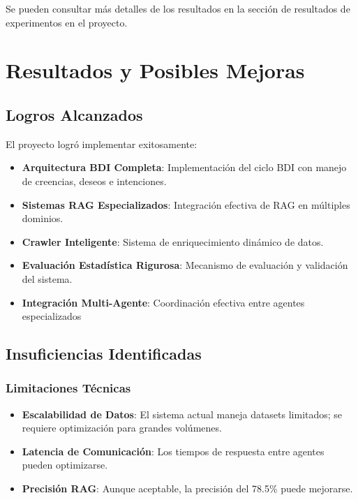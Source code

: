 \documentclass[runningheads,a4paper]{llncs}
\begin{document}
Se pueden consultar más detalles de los resultados en la sección de resultados de experimentos en el proyecto.

\section{Resultados y Posibles Mejoras}

\subsection{Logros Alcanzados}

El proyecto logró implementar exitosamente:

\begin{itemize}
    \item \textbf{Arquitectura BDI Completa}: Implementación del ciclo BDI con manejo de creencias, deseos e intenciones.
    \item \textbf{Sistemas RAG Especializados}: Integración efectiva de RAG en múltiples dominios.
    \item \textbf{Crawler Inteligente}: Sistema de enriquecimiento dinámico de datos.
    \item \textbf{Evaluación Estadística Rigurosa}: Mecanismo de evaluación y validación del sistema.
    \item \textbf{Integración Multi-Agente}: Coordinación efectiva entre agentes especializados
\end{itemize}

\subsection{Insuficiencias Identificadas}

\subsubsection{Limitaciones Técnicas}
\begin{itemize}
    \item \textbf{Escalabilidad de Datos}: El sistema actual maneja datasets limitados; se requiere optimización para 
    grandes volúmenes.
    \item \textbf{Latencia de Comunicación}: Los tiempos de respuesta entre agentes pueden optimizarse.
    \item \textbf{Precisión RAG}: Aunque aceptable, la precisión del 78.5\% puede mejorarse.
\end{itemize}
\end{document}
